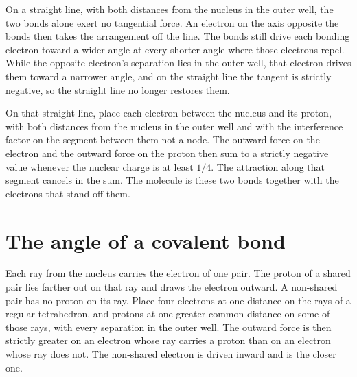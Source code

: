 \documentclass[a4paper]{article}
\begin{document}
On a straight line, with both distances from the nucleus in the outer well, the two bonds alone exert no tangential force. An electron on the axis opposite the bonds then takes the arrangement off the line. The bonds still drive each bonding electron toward a wider angle at every shorter angle where those electrons repel. While the opposite electron's separation lies in the outer well, that electron drives them toward a narrower angle, and on the straight line the tangent is strictly negative, so the straight line no longer restores them.

On that straight line, place each electron between the nucleus and its proton, with both distances from the nucleus in the outer well and with the interference factor on the segment between them not a node. The outward force on the electron and the outward force on the proton then sum to a strictly negative value whenever the nuclear charge is at least \(1/4\). The attraction along that segment cancels in the sum. The molecule is these two bonds together with the electrons that stand off them.

\section{The angle of a covalent bond}
\label{sec:angle}

Each ray from the nucleus carries the electron of one pair. The proton of a shared pair lies farther out on that ray and draws the electron outward. A non-shared pair has no proton on its ray. Place four electrons at one distance on the rays of a regular tetrahedron, and protons at one greater common distance on some of those rays, with every separation in the outer well. The outward force is then strictly greater on an electron whose ray carries a proton than on an electron whose ray does not. The non-shared electron is driven inward and is the closer one.
\end{document}

